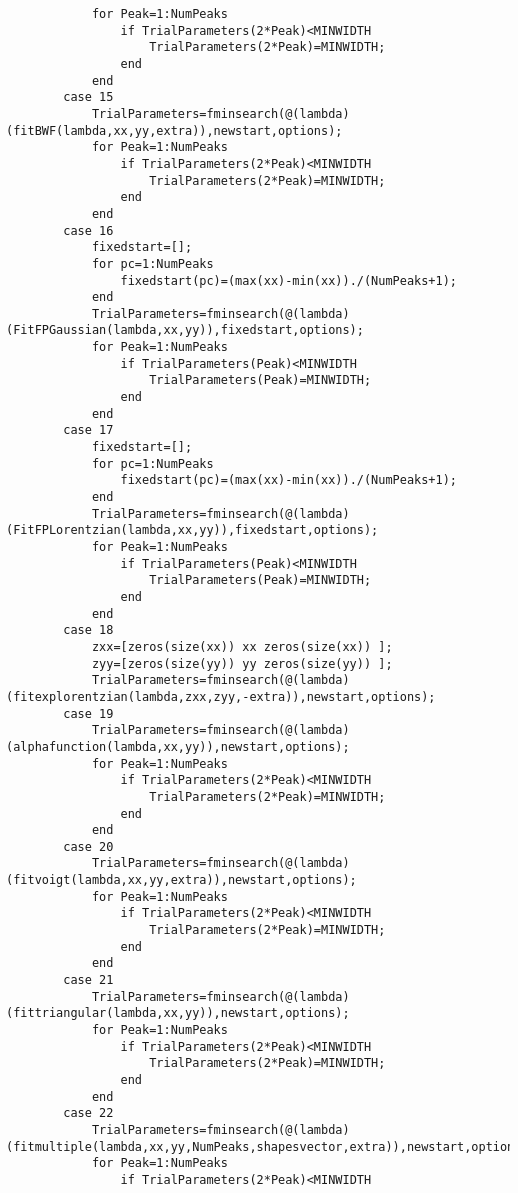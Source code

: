 \begin{lstlisting}
            for Peak=1:NumPeaks
                if TrialParameters(2*Peak)<MINWIDTH
                    TrialParameters(2*Peak)=MINWIDTH;
                end
            end
        case 15
            TrialParameters=fminsearch(@(lambda)(fitBWF(lambda,xx,yy,extra)),newstart,options);
            for Peak=1:NumPeaks
                if TrialParameters(2*Peak)<MINWIDTH
                    TrialParameters(2*Peak)=MINWIDTH;
                end
            end
        case 16
            fixedstart=[];
            for pc=1:NumPeaks
                fixedstart(pc)=(max(xx)-min(xx))./(NumPeaks+1);
            end
            TrialParameters=fminsearch(@(lambda)(FitFPGaussian(lambda,xx,yy)),fixedstart,options);
            for Peak=1:NumPeaks
                if TrialParameters(Peak)<MINWIDTH
                    TrialParameters(Peak)=MINWIDTH;
                end
            end
        case 17
            fixedstart=[];
            for pc=1:NumPeaks
                fixedstart(pc)=(max(xx)-min(xx))./(NumPeaks+1);
            end
            TrialParameters=fminsearch(@(lambda)(FitFPLorentzian(lambda,xx,yy)),fixedstart,options);
            for Peak=1:NumPeaks
                if TrialParameters(Peak)<MINWIDTH
                    TrialParameters(Peak)=MINWIDTH;
                end
            end
        case 18
            zxx=[zeros(size(xx)) xx zeros(size(xx)) ];
            zyy=[zeros(size(yy)) yy zeros(size(yy)) ];
            TrialParameters=fminsearch(@(lambda)(fitexplorentzian(lambda,zxx,zyy,-extra)),newstart,options);
        case 19
            TrialParameters=fminsearch(@(lambda)(alphafunction(lambda,xx,yy)),newstart,options);
            for Peak=1:NumPeaks
                if TrialParameters(2*Peak)<MINWIDTH
                    TrialParameters(2*Peak)=MINWIDTH;
                end
            end
        case 20
            TrialParameters=fminsearch(@(lambda)(fitvoigt(lambda,xx,yy,extra)),newstart,options);
            for Peak=1:NumPeaks
                if TrialParameters(2*Peak)<MINWIDTH
                    TrialParameters(2*Peak)=MINWIDTH;
                end
            end
        case 21
            TrialParameters=fminsearch(@(lambda)(fittriangular(lambda,xx,yy)),newstart,options);
            for Peak=1:NumPeaks
                if TrialParameters(2*Peak)<MINWIDTH
                    TrialParameters(2*Peak)=MINWIDTH;
                end
            end
        case 22
            TrialParameters=fminsearch(@(lambda)(fitmultiple(lambda,xx,yy,NumPeaks,shapesvector,extra)),newstart,options);
            for Peak=1:NumPeaks
                if TrialParameters(2*Peak)<MINWIDTH

\end{lstlisting}

